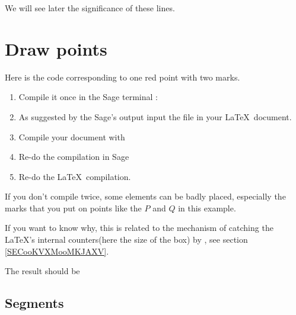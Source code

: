 We will see later the significance of these lines.

\section{Draw points}

Here is the code corresponding to one red point with two marks.



\begin{enumerate}
    \item
        
Compile it once in the Sage terminal :



\item

    As suggested by the Sage's output input the file  in your \LaTeX\ document.

\item

    Compile your document with 

\item
    Re-do the compilation in Sage
\item
    Re-do the \LaTeX\ compilation.
\end{enumerate}
If you don't compile twice, some elements can be badly placed, especially the marks that you put on points like the \( P\) and \( Q\) in this example.

If you want to know why, this is related to the mechanism of catching the \LaTeX's internal counters(here the size of the box) by \phystricks, see section \ref{SECooKVXMooMKJAXV}.

The result should be

\begin{center}
   
\end{center}

\subsection{Segments}

